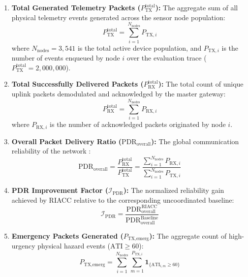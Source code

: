 \documentclass[preprint,review,12pt]{elsarticle}
\begin{document}
\begin{enumerate}

    \item \textbf{Total Generated Telemetry Packets ($P_{\text{TX}}^{\text{total}}$):} The aggregate sum of all physical telemetry events generated across the sensor node population:
    \begin{equation}
        P_{\text{TX}}^{\text{total}} = \sum_{i=1}^{N_{\text{nodes}}} P_{\text{TX}, i}
        \label{eq:ptx_total}
    \end{equation}
    where $N_{\text{nodes}} = 3,541$ is the total active device population, and $P_{\text{TX}, i}$ is the number of events enqueued by node $i$ over the evaluation trace ($P_{\text{TX}}^{\text{total}} = 2,000,000$).

    \item \textbf{Total Successfully Delivered Packets ($P_{\text{RX}}^{\text{total}}$):} The total count of unique uplink packets demodulated and acknowledged by the master gateway:
    \begin{equation}
        P_{\text{RX}}^{\text{total}} = \sum_{i=1}^{N_{\text{nodes}}} P_{\text{RX}, i}
        \label{eq:prx_total}
    \end{equation}
    where $P_{\text{RX}, i}$ is the number of acknowledged packets originated by node $i$.

    \item \textbf{Overall Packet Delivery Ratio ($\text{PDR}_{\text{overall}}$):} The global communication reliability of the network \cite{adelantado2017understanding}:
    \begin{equation}
        \text{PDR}_{\text{overall}} = \frac{P_{\text{RX}}^{\text{total}}}{P_{\text{TX}}^{\text{total}}} = \frac{ \sum_{i=1}^{N_{\text{nodes}}} P_{\text{RX}, i} }{ \sum_{i=1}^{N_{\text{nodes}}} P_{\text{TX}, i} }
        \label{eq:eval_pdr_overall}
    \end{equation}

    \item \textbf{PDR Improvement Factor ($\mathcal{I}_{\text{PDR}}$):} The normalized reliability gain achieved by RIACC relative to the corresponding uncoordinated baseline:
    \begin{equation}
        \mathcal{I}_{\text{PDR}} = \frac{\text{PDR}_{\text{overall}}^{\text{RIACC}}}{\text{PDR}_{\text{overall}}^{\text{Baseline}}}
        \label{eq:eval_pdr_gain}
    \end{equation}

    \item \textbf{Emergency Packets Generated ($P_{\text{TX}, \text{emerg}}$):} The aggregate count of high-urgency physical hazard events ($\text{ATI} \ge 60$):
    \begin{equation}
        P_{\text{TX}, \text{emerg}} = \sum_{i=1}^{N_{\text{nodes}}} \sum_{m=1}^{P_{\text{TX}, i}} \mathbf{1}_{\{\text{ATI}_{i,m} \ge 60\}}
        \label{eq:ptx_emerg}
    \end{equation}


\end{enumerate}
\end{document}
